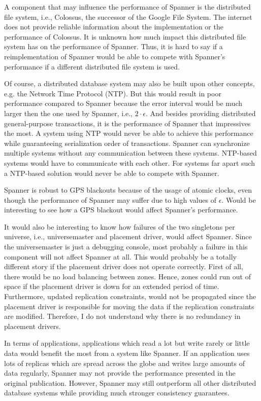 \documentclass[onecolumn, a4paper, 10pt]{article}
\begin{document}
A component that may influence the performance of Spanner is the distributed
file system, i.e., Colossus, the successor of the Google File System. The internet 
does not provide reliable information about the implementation or the performance
of Colossus. It is unknown how much impact this distributed file system has on the
performance of Spanner. Thus, it is hard to say if a reimplementation of Spanner
would be able to compete with Spanner's performance if a different distributed
file system is used.

Of course, a distributed database system may also be built upon other concepts,
e.g. the Network Time Protocol (NTP). But this would result in poor performance
compared to Spanner because the error interval would be much larger then the one
used by Spanner, i.e., $2\cdot\epsilon$. And besides providing distributed
general-purpose transactions, it is the performance of Spanner that impressives
the most. A system using NTP would never be able to achieve this performance
while guaranteeing serialization order of transactions. Spanner can synchronize
multiple systems without any communication between these systems. NTP-based
systems would have to communicate with each other. For systems far apart such a
NTP-based solution would never be able to compete with Spanner.

Spanner is robust to GPS blackouts because of the usage of atomic clocks, even
though the performance of Spanner may suffer due to high values of $\epsilon$.
Would be interesting to see how a GPS blackout would affect Spanner's performance.

It would also be interesting to know how failures of the two singletons per
universe, i.e., universemaster and placement driver, would affect Spanner. Since
the universemaster is just a debugging console, most probably a failure in this
component will not affect Spanner at all. This would probably be a totally
different story if the placement driver does not operate correctly. First of all,
there would be no load balancing between zones. Hence, zones could run out of
space if the placement driver is down for an extended period of time. Furthermore,
updated replication constraints, would not be propagated since the placement
driver is responsible for moving the data if the replication constraints are
modified. Therefore, I do not understand why there is no redundancy in placement
drivers.

In terms of applications, applications which read a lot but write rarely or little
data would benefit the most from a system like Spanner. If an application uses
lots of replicas which are spread across the globe and writes large amounts of data
regularly, Spanner may not provide the performance presented in the original
publication. However, Spanner may still outperform all other distributed database
systems while providing much stronger consistency guarantees.



\end{document}
